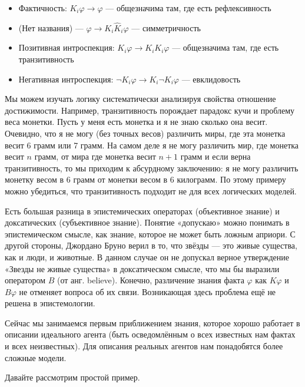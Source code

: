 \documentclass[openany]{book}
\theoremstyle{plain}
\theoremstyle{definition}
\begin{document}
\begin{itemize}
\item Фактичность: \(K_i \varphi \to \varphi\) — общезначима там, где есть рефлексивность
\item (Нет названия) — \(\varphi \to K_i \hat{K}_i \varphi\) — симметричность
\item Позитивная интроспекция: \(K_i \varphi \to K_i K_i \varphi\) — общезначима там, где есть транзитивность
\item Негативная интроспекция: \(\neg K_i \varphi \to K_i \neg K_i \varphi\) — евклидовость
\end{itemize}

Мы можем изучать логику систематически анализируя свойства отношение достижимости. Например, транзитивность порождает парадокс кучи и проблему веса монетки. Пусть у меня есть монетка и я не знаю сколько она весит. Очевидно, что я не могу (без точных весов) различить миры, где эта монетка весит 6 грамм или 7 грамм. На самом деле я не могу различить мир, где монетка весит \(n\) грамм, от мира где монетка весит \(n+1\) грамм и если верна транзитивность, то мы приходим к абсурдному заключению: я не могу различить монетку весом в 6 грамм от монетки весом в 6 килограмм. По этому примеру можно убедиться, что транзитивность подходит не для всех логических моделей.

Есть большая разница в эпистемических операторах (объективное знание) и доксатических (субъективное знание). Понятие «допускаю» можно понимать в эпистемическом смысле, как знание, которое не может быть ложным априори. С другой стороны, Джордано Бруно верил в то, что звёзды — это живые существа, как и люди, и животные. В данном случае он не допускал верное утверждение «Звезды не живые существа» в доксатическом смысле, что мы бы выразили оператором \(B\) (от анг. believe). Конечно, различение знания факта \(\varphi\) как \(K\varphi\) и \(B\varphi\) не отменяет вопроса об их связи. Возникающая здесь проблема ещё не решена в эпистемологии.

Сейчас мы занимаемся первым приближением знания, которое хорошо работает в описании идеального агента (быть осведомлённым о всех известных нам фактах и всех неизвестных). Для описания реальных агентов нам понадобятся более сложные модели.



Давайте рассмотрим простой пример.
\end{document}
